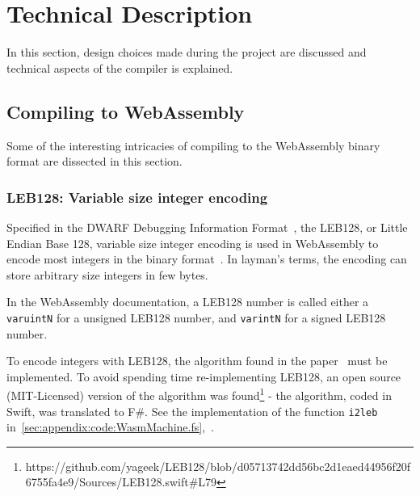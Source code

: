 \documentclass[a4paper]{article}
\begin{document}
\section{Technical Description}
\label{sec:technical}
In this section, design choices made during the project are discussed and technical aspects of the compiler is explained.

\subsection{}

\subsection{Compiling to WebAssembly}
\label{sec:technical:webassembly}
Some of the interesting intricacies of compiling to the WebAssembly binary format are dissected in this section.

\subsubsection{LEB128: Variable size integer encoding}
Specified in the DWARF Debugging Information Format~\cite{DWARF}, the LEB128, or Little Endian Base 128, variable size integer encoding is used in WebAssembly to encode most integers in the binary format~\cite[\#numbers]{website:wasm-binary-encoding}. In layman's terms, the encoding can store arbitrary size integers in few bytes.

In the WebAssembly documentation, a LEB128 number is called either a \texttt{varuintN} for a unsigned LEB128 number, and \texttt{varintN} for a signed LEB128 number.

To encode integers with LEB128, the algorithm found in the paper~\cite{DWARF} must be implemented. To avoid spending time re-implementing LEB128, an open source (MIT-Licensed) version of the algorithm was found\footnote{https://github.com/yageek/LEB128/blob/d05713742dd56bc2d1eaed44956f20f6755fa4e9/Sources/LEB128.swift\#L79} - the algorithm, coded in Swift, was translated to F\#. See the implementation of the function \texttt{i2leb} in~\ref{sec:appendix:code:WasmMachine.fs},~.
\end{document}
